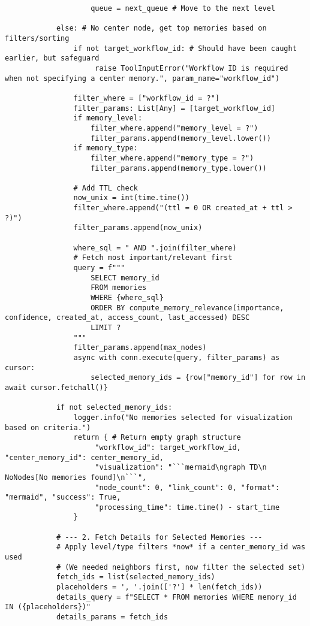 \documentclass[12pt,a4paper]{article}
\begin{document}
\begin{pageablecode}
\begin{verbatim}
                    queue = next_queue # Move to the next level

            else: # No center node, get top memories based on filters/sorting
                if not target_workflow_id: # Should have been caught earlier, but safeguard
                     raise ToolInputError("Workflow ID is required when not specifying a center memory.", param_name="workflow_id")

                filter_where = ["workflow_id = ?"]
                filter_params: List[Any] = [target_workflow_id]
                if memory_level:
                    filter_where.append("memory_level = ?")
                    filter_params.append(memory_level.lower())
                if memory_type:
                    filter_where.append("memory_type = ?")
                    filter_params.append(memory_type.lower())

                # Add TTL check
                now_unix = int(time.time())
                filter_where.append("(ttl = 0 OR created_at + ttl > ?)")
                filter_params.append(now_unix)

                where_sql = " AND ".join(filter_where)
                # Fetch most important/relevant first
                query = f"""
                    SELECT memory_id
                    FROM memories
                    WHERE {where_sql}
                    ORDER BY compute_memory_relevance(importance, confidence, created_at, access_count, last_accessed) DESC
                    LIMIT ?
                """
                filter_params.append(max_nodes)
                async with conn.execute(query, filter_params) as cursor:
                    selected_memory_ids = {row["memory_id"] for row in await cursor.fetchall()}

            if not selected_memory_ids:
                logger.info("No memories selected for visualization based on criteria.")
                return { # Return empty graph structure
                     "workflow_id": target_workflow_id, "center_memory_id": center_memory_id,
                     "visualization": "```mermaid\ngraph TD\n    NoNodes[No memories found]\n```",
                     "node_count": 0, "link_count": 0, "format": "mermaid", "success": True,
                     "processing_time": time.time() - start_time
                }

            # --- 2. Fetch Details for Selected Memories ---
            # Apply level/type filters *now* if a center_memory_id was used
            # (We needed neighbors first, now filter the selected set)
            fetch_ids = list(selected_memory_ids)
            placeholders = ', '.join(['?'] * len(fetch_ids))
            details_query = f"SELECT * FROM memories WHERE memory_id IN ({placeholders})"
            details_params = fetch_ids
            

\end{verbatim}
\end{pageablecode}
\end{document}
